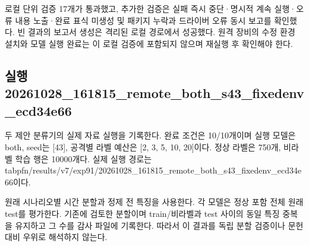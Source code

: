 로컬 단위 검증 17개가 통과했고, 추가한 검증은 실패 즉시 중단·명시적 계속 실행·오류 내용 노출·완료 표식 미생성 및 패키지 누락과 드라이버 오류 동시 보고를 확인했다.
빈 결과의 보고서 생성은 격리된 로컬 경로에서 성공했다.
원격 장비의 수정 환경 설치와 모델 실행 완료는 이 로컬 검증에 포함되지 않으며 재실행 후 확인해야 한다.


\subsection{실행 20261028\_\allowbreak{}161815\_\allowbreak{}remote\_\allowbreak{}both\_\allowbreak{}s43\_\allowbreak{}fixedenv\_\allowbreak{}ecd34e66}
두 제안 분류기의 실제 자료 실행을 기록한다. 완료 조건은 10/\allowbreak{}10개이며 실행 모델은 both, seed는 [43], 공격별 라벨 예산은 [2, 3, 5, 10, 20]이다. 정상 라벨은 750개, 비라벨 학습 행은 10000개다. 실제 실행 경로는 tabpfn/\allowbreak{}results/\allowbreak{}v7/\allowbreak{}exp91/\allowbreak{}20261028\_\allowbreak{}161815\_\allowbreak{}remote\_\allowbreak{}both\_\allowbreak{}s43\_\allowbreak{}fixedenv\_\allowbreak{}ecd34e66이다.

원래 시나리오별 시간 분할과 정제 전 특징을 사용한다. 각 모델은 정상 포함 전체 원래 test를 평가한다. 기존에 검토한 분할이며 train/\allowbreak{}비라벨과 test 사이의 동일 특징 중복을 유지하고 그 수를 감사 파일에 기록한다. 따라서 이 결과를 독립 분할 검증이나 문헌 대비 우위로 해석하지 않는다.

